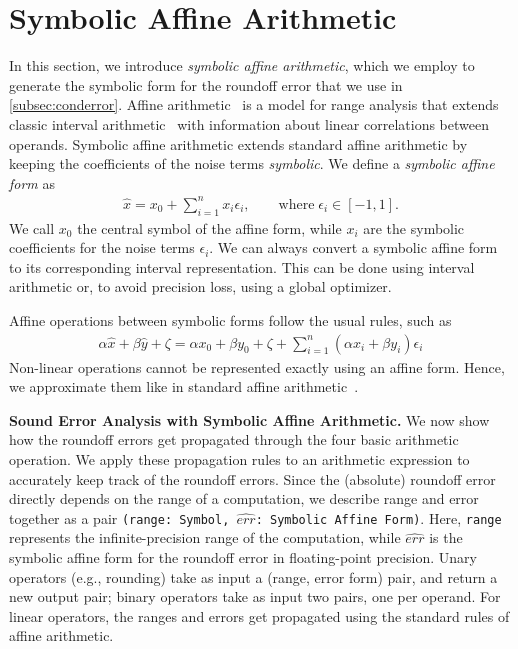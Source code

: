 \section{Symbolic Affine Arithmetic}
\label{sec:symbolicaffine}

In this section, we introduce \emph{symbolic affine arithmetic}, which we
employ to generate the symbolic form for the roundoff error that we use in
\cref{subsec:conderror}.
%
Affine arithmetic~\cite{affineoriginal} is a model for range analysis that extends classic interval arithmetic~\cite{intervalarithmetic} with information about linear correlations between operands.
%
Symbolic affine arithmetic extends standard affine arithmetic by keeping the coefficients of the noise terms \emph{symbolic}.
%
%
We define a \emph{symbolic affine form} as
%
\begin{align}
\hat{x}= x_{0}+\sum_{i=1}^{n} x_{i}\epsilon_{i},\qquad\text{where}\; \epsilon_{i} \in [-1, 1]. \label{eq:affineform}
\end{align}
%
We call $x_{0}$ the central symbol of the affine form, while $x_{i}$ are the symbolic coefficients for the noise terms $\epsilon_{i}$.
We can always convert a symbolic affine form to its corresponding interval representation. 
%
This can be done using interval arithmetic or, to avoid precision loss, using a
global optimizer.
%

Affine operations between symbolic forms follow the usual rules, such as
\begin{align*} 
\alpha\hat{x}+\beta\hat{y}+\zeta=\alpha{x_{0}}+\beta{y_{0}}+\zeta+\sum_{i=1}^{n}{(\alpha x_{i}+\beta y_{i})\epsilon_{i}} 
\end{align*}
%
Non-linear operations cannot be represented exactly using an affine form.
%
Hence, we approximate them like in standard affine arithmetic~\cite{affinebook}.
%

\noindent \textbf{Sound Error Analysis with Symbolic Affine Arithmetic.}
We now show how the roundoff errors get propagated through the four basic arithmetic operation.
%
We apply these propagation rules to an arithmetic expression
to accurately keep track of the roundoff errors. 
%
Since the (absolute) roundoff error directly depends on the range of a computation,  we describe range and error together as a pair
%
\texttt{(range: Symbol, $\widehat{err}$: Symbolic Affine Form)}.
Here, \texttt{range} represents the infinite-precision range of the computation, while $\widehat{err}$ is the symbolic affine form for the roundoff error in floating-point precision.
Unary operators (e.g., rounding) take as input a (range, error form) pair, and return a new output pair;
binary operators take as input two pairs, one per operand.
%
For linear operators, the ranges and errors get propagated using the standard rules of affine arithmetic.
%

